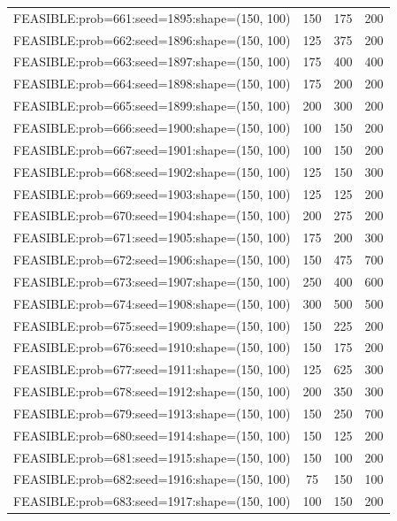 \begin{longtable}{lccc}
FEASIBLE:prob=661:seed=1895:shape=(150, 100) &      150 &   175 &    200 \\
FEASIBLE:prob=662:seed=1896:shape=(150, 100) &      125 &   375 &    200 \\
FEASIBLE:prob=663:seed=1897:shape=(150, 100) &      175 &   400 &    400 \\
FEASIBLE:prob=664:seed=1898:shape=(150, 100) &      175 &   200 &    200 \\
FEASIBLE:prob=665:seed=1899:shape=(150, 100) &      200 &   300 &    200 \\
FEASIBLE:prob=666:seed=1900:shape=(150, 100) &      100 &   150 &    200 \\
FEASIBLE:prob=667:seed=1901:shape=(150, 100) &      100 &   150 &    200 \\
FEASIBLE:prob=668:seed=1902:shape=(150, 100) &      125 &   150 &    300 \\
FEASIBLE:prob=669:seed=1903:shape=(150, 100) &      125 &   125 &    200 \\
FEASIBLE:prob=670:seed=1904:shape=(150, 100) &      200 &   275 &    200 \\
FEASIBLE:prob=671:seed=1905:shape=(150, 100) &      175 &   200 &    300 \\
FEASIBLE:prob=672:seed=1906:shape=(150, 100) &      150 &   475 &    700 \\
FEASIBLE:prob=673:seed=1907:shape=(150, 100) &      250 &   400 &    600 \\
FEASIBLE:prob=674:seed=1908:shape=(150, 100) &      300 &   500 &    500 \\
FEASIBLE:prob=675:seed=1909:shape=(150, 100) &      150 &   225 &    200 \\
FEASIBLE:prob=676:seed=1910:shape=(150, 100) &      150 &   175 &    200 \\
FEASIBLE:prob=677:seed=1911:shape=(150, 100) &      125 &   625 &    300 \\
FEASIBLE:prob=678:seed=1912:shape=(150, 100) &      200 &   350 &    300 \\
FEASIBLE:prob=679:seed=1913:shape=(150, 100) &      150 &   250 &    700 \\
FEASIBLE:prob=680:seed=1914:shape=(150, 100) &      150 &   125 &    200 \\
FEASIBLE:prob=681:seed=1915:shape=(150, 100) &      150 &   100 &    200 \\
FEASIBLE:prob=682:seed=1916:shape=(150, 100) &       75 &   150 &    100 \\
FEASIBLE:prob=683:seed=1917:shape=(150, 100) &      100 &   150 &    200 \\

\end{longtable}

